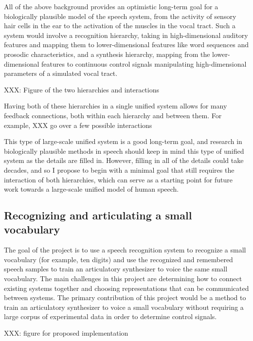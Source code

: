 \documentclass{article}
\begin{document}
All of the above background
provides an optimistic long-term
goal for a biologically plausible
model of the speech system,
from the activity of sensory
hair cells in the ear
to the activation of
the muscles in the vocal tract.
Such a system would involve
a recognition hierarchy,
taking in high-dimensional auditory features
and mapping them to lower-dimensional
features like word sequences
and prosodic characteristics,
and a synthesis hierarchy,
mapping from the lower-dimensional features
to continuous control signals
manipulating high-dimensional parameters
of a simulated vocal tract.

XXX: Figure of the two hierarchies and interactions

Having both of these hierarchies
in a single unified system
allows for many feedback connections,
both within each hierarchy
and between them.
For example,
XXX go over a few possible interactions

This type of large-scale unified system
is a good long-term goal,
and research in biologically plausible
methods in speech should keep in mind
this type of unified system
as the details are filled in.
However, filling in all of the details
could take decades,
and so I propose to begin
with a minimal goal that still
requires the interaction of both hierarchies,
which can serve as a starting point
for future work towards a large-scale
unified model of human speech.

\subsection{Recognizing and articulating a small vocabulary}

The goal of the project is to
use a speech recognition system
to recognize a small vocabulary
(for example, ten digits)
and use the recognized and remembered
speech samples to train
an articulatory synthesizer
to voice the same small vocabulary.
The main challenges in this project
are determining how to connect
existing systems together
and choosing representations that
can be communicated between systems.
The primary contribution of this project
would be a method to train an
articulatory synthesizer
to voice a small vocabulary
without requiring a large corpus
of experimental data
in order to determine control signals.

XXX: figure for proposed implementation
\end{document}
